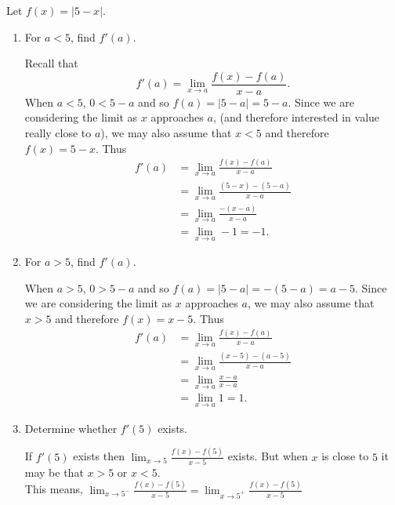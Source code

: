 \documentclass[nooutcomes,handout]{ximera}
\begin{document}
	
\begin{problem}
Let $f(x) = |5-x|$.
	
	\begin{enumerate}
	
	\item For $a < 5$, find $f'(a)$.
	
		\begin{freeResponse}
		Recall that 
		$$f'(a) = \lim_{x \to a} \frac{f(x) - f(a)}{x-a}.$$
		When $a < 5$, $0 < 5-a$ and so $f(a) = |5-a| = 5-a$.  Since we are considering the limit as $x$ approaches $a$, (and therefore interested in value really close to $a$), we may also assume that $x < 5$ and therefore $f(x) = 5-x$.  Thus
		\begin{align*}
		f'(a) &= \lim_{x \to a} \frac{f(x) - f(a)}{x-a}  \\
		&= \lim_{x \to a} \frac{(5-x) - (5-a)}{x-a}  \\
		&= \lim_{x \to a} \frac{-(x-a)}{x-a}  \\
		&= \lim_{x \to a} -1 = -1.
		\end{align*}

		\end{freeResponse}

	\item For $a > 5$, find $f'(a)$.
	
		\begin{freeResponse}
		When $a > 5$, $0 > 5-a$ and so $f(a) = |5-a| = -(5-a) = a-5$.  Since we are considering the limit as $x$ approaches $a$, we may also assume that $x > 5$ and therefore $f(x) = x-5$.  Thus
		\begin{align*}
		f'(a) &= \lim_{x \to a} \frac{f(x) - f(a)}{x-a}  \\
		&= \lim_{x \to a} \frac{(x-5) - (a-5)}{x-a}  \\
		&= \lim_{x \to a} \frac{x-a}{x-a}  \\
		&= \lim_{x \to a} 1 = 1.
		\end{align*}

		\end{freeResponse}
	\item Determine whether $f'(5)$ exists.  
	
		\begin{freeResponse}
		If  $f'(5)$ exists then $\lim_{x \to 5} \frac{f(x) - f(5)}{x-5}$ exists.  But when $x$ is close to $5$ it may be that $x>5$ or $x<5$. \\
		This means,  $\lim_{x \to 5^-} \frac{f(x) - f(5)}{x-5}=\lim_{x \to 5^+} \frac{f(x) - f(5)}{x-5}$\\ 


\end{freeResponse}
\end{enumerate}
\end{problem}
\end{document}
